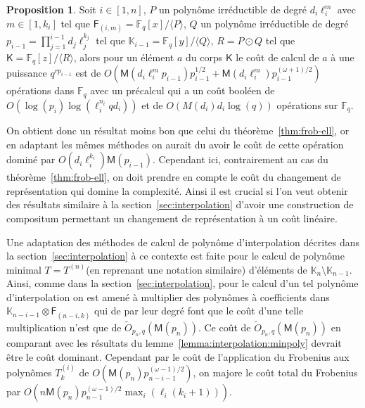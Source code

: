 \documentclass[10pt,a4paper]{book}
\theoremstyle{plain}
\theoremstyle{definition}
\theoremstyle{definition}
\theoremstyle{definition}
\newtheorem{prop}[thm]{Proposition}
\theoremstyle{definition}
\theoremstyle{remark}
\theoremstyle{remark}
\theoremstyle{definition}
\begin{document}
\begin{prop}
\label{pro:fro:com}
Soit $i \in [1,n]$, $P$ un polynôme irréductible de degré $d_i\ell_i^{m}$ avec 
$m \in [1,k_i]$ tel que $\mathsf{F}_{(i,m)}=\mathbb{F}_q[x]/\langle P \rangle$,
$Q$ un polynôme irréductible de degré $p_{i-1}=\prod_{j=1}^{i-1}d_j\ell_j^{k_j}$
tel que $\mathbb{K}_{i-1}=\mathbb{F}_q[y]/\langle Q \rangle$, $R=P \odot Q$ 
tel que  $\mathsf{K}=\mathbb{F}_q[z]/\langle R\rangle$, alors pour un 
élément $a$ du corps $\mathsf{K}$ le coût de calcul de $a$ à une puissance 
$q^{r p_{i-1}}$ est de 
$O(\mathsf{M}(d_i\ell_i^{m}p_{i-1})p_{i-1}^{1/2}+\mathsf{M}(d_i\ell_i^{m})p_{i-1}^{(\omega+1)/2})$ 
opérations dans $\mathbb{F}_q$ avec un 
précalcul qui a un coût booléen de $O(\log(p_{i})\log(\ell_i^{n_i}qd_i))$ et  
de $O( M(d_i) d_i\log(q))$ opérations sur $\mathbb{F}_q$.
\end{prop}

 
On obtient donc un résultat moins bon que celui du
théorème~\ref{thm:frob-ell}, or en adaptant les mêmes méthodes on aurait du 
avoir le coût de cette opération dominé par $O(d_i\ell_i^{k_i})\mathsf{M}(p_{i-1})$. 
Cependant ici, contrairement au cas du théorème~\ref{thm:frob-ell}, on doit prendre en 
compte le coût du changement de représentation qui domine la complexité. Ainsi 
il est crucial si l'on veut obtenir des résultats similaire à la 
section~\ref{sec:interpolation} d'avoir une construction de compositum permettant un 
changement de représentation à un coût linéaire.

Une adaptation des méthodes de calcul de polynôme d'interpolation décrites dans
la section~\ref{sec:interpolation} à ce contexte est faite pour le calcul de 
polynôme minimal $T=T^{(n)}$(en reprenant une notation similaire) d'éléments de 
$\mathbb{K}_n \setminus \mathbb{K}_{n-1}$.
Ainsi, comme dans la section~\ref{sec:interpolation}, 
pour le calcul d'un tel polynôme d'interpolation on est amené à 
multiplier des polynômes à coefficients dans $\mathbb{K}_{n-i-1} \otimes 
\mathsf{F}_{(n-i,k)}$ qui de par leur degré font que le coût d'une telle 
multiplication n'est que de $\tilde{O}_{p_n,q}(\mathsf{M}(p_n))$. Ce coût de 
$\tilde{O}_{p_n,q}(\mathsf{M}(p_n))$ en comparant 
avec les résultats du lemme~\ref{lemma:interpolation:minpoly} devrait être le 
coût dominant. Cependant par le coût de 
l'application du Frobenius aux polynômes $T^{(i)}_k$ de $O(\mathsf{M}
(p_n)p_{n-i-1}^{(\omega-1)/2})$, on majore le coût total du Frobenius par 
$O(n\mathsf{M}(p_n)p_{n-1}^{(\omega-1)/2}\max_i(\ell_{i}(k_{i}+1)))$. %
\end{document}

